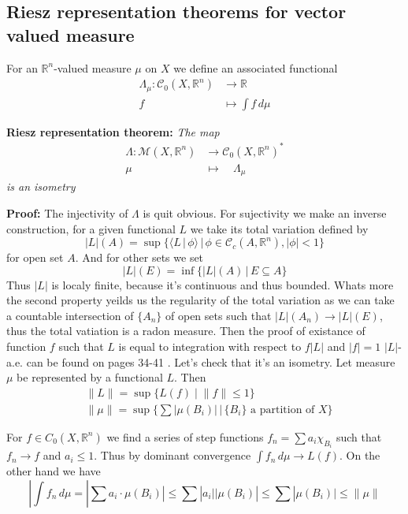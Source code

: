\subsection{Riesz representation theorems for vector valued measure}
For an $\mathbb{R}^n$-valued measure $\mu$ on $X$ we define an associated
functional
\begin{align*}
\Lambda_\mu:\mathcal C_0(X,\mathbb{R}^n)&\rightarrow\mathbb{R}\\
f&\mapsto\int f\,d\mu
\end{align*}

\textbf{Riesz representation theorem:} \textit{
The map
\begin{align*}
\Lambda:\mathcal{M}(X, \mathbb{R}^n)&\rightarrow\mathcal{C}_0(X,\mathbb{R}^n)^*\\
\mu\quad&\mapsto\quad\Lambda_\mu
\end{align*}
is an isometry}

\vspace{1ex}
\textbf{Proof:} The injectivity of $\Lambda$ is quit obvious. For sujectivity
we make an inverse construction, for a given functional $L$ we take its total
variation defined by
\[|L|(A)=\sup\{\langle L\,|\,\phi\rangle\,|\,\phi\in\mathcal C_c(A,\mathbb R^n), |\phi|<1\}\]
for open set $A$. And for other sets we set
\[|L|(E)=\inf\{|L|(A)\,|\,E\subseteq A\}\]
Thus $|L|$ is localy finite, because it's continuous and thus bounded. Whats
more the second property yeilds us the regularity of the total variation as we
can take a countable intersection of $\{A_n\}$ of open sets such that $|L|(A_n)
\rightarrow |L|(E)$, thus the total vatiation is a radon measure. Then the
proof of existance of function $f$ such that $L$ is equal to integration with
respect to $f|L|$ and $|f|=1$ $|L|$-a.e. can be found on pages 34-41
\cite{maggi}. Let's check that it's an isometry. Let measure $\mu$ be
represented by a functional $L$. Then 
\begin{align*}
    &\|L\|=\sup\{L(f)\;|\;\|f\|\le1\}\\
    &\|\mu\|=\sup\{\sum|\mu(B_i)|\,|\,\{B_i\}\text{ a partition of } X\}
\end{align*}

For $f\in C_0(X,\mathbb R^n)$ we find a series of step functions $f_n=\sum a_i\chi_{B_i}$ 
such that $f_n\rightarrow f$ and $a_i\leq 1$. Thus by dominant convergence
$\int f_n\,d\mu\rightarrow L(f)$. On the other hand we have
\[|\int f_n\,d\mu = |\sum a_i\cdot\mu(B_i)|\leq\sum|a_i||\mu(B_i)|\leq\sum|\mu(B_i)|\leq\|\mu\|\]

